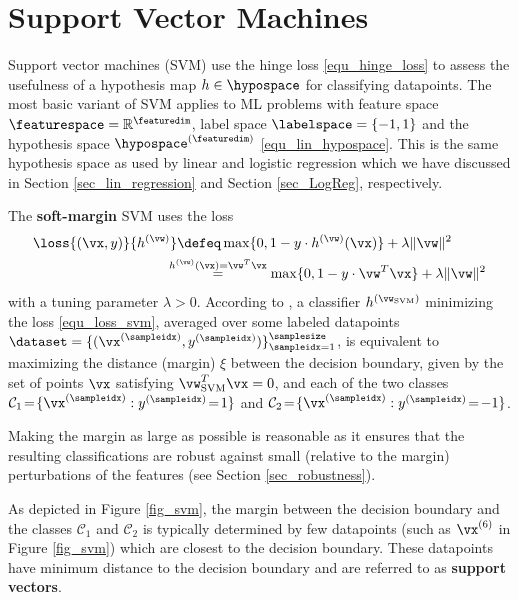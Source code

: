 \documentclass[12pt]{report}
\begin{document}
\section{Support Vector Machines} 
\label{sec_SVM} 
Support vector machines (SVM) use the hinge loss \eqref{equ_hinge_loss} to 
assess the usefulness of a hypothesis map $h \in \hypospace$ for classifying datapoints. 
The most basic variant of SVM applies to ML problems with feature space 
$\featurespace=\mathbb{R}^{\featuredim}$, label space $\labelspace = \{-1,1\}$ 
and the hypothesis space $\hypospace^{(\featuredim)}$ \eqref{equ_lin_hypospace}. 
This is the same hypothesis space as used by linear and logistic regression 
which we have discussed in Section \ref{sec_lin_regression} and Section \ref{sec_LogReg}, 
respectively. 

The {\bf soft-margin} SVM \cite[Chapter 2]{LampertNowKernel} uses the loss  
\begin{align}
\loss{(\vx,y)}{h^{(\vw)}} & \defeq  \max \{ 0 , 1 - y\cdot h^{(\vw)}(\vx) \}  + \lambda \| \vw \|^{2} \nonumber \\
   & \hspace*{-3mm}\stackrel{h^{(\vw)}(\vx) = \vw^{T} \vx}{=}  \max \{ 0 , 1 - y\cdot \vw^{T} \vx \} + \lambda \| \vw \|^{2} \label{equ_loss_svm}
\end{align}
with a tuning parameter $\lambda >0$. According to \cite[Chapter 2]{LampertNowKernel}, a classifier $h^{(\vw_{\rm SVM})}$ 
minimizing the loss \eqref{equ_loss_svm}, averaged over some labeled datapoints $\dataset = \{ ( \vx^{(\sampleidx)}, y^{(\sampleidx)}) \}_{\sampleidx=1}^{\samplesize}$, 
is equivalent to maximizing the distance (margin) $\xi$ between 
the decision boundary, given by the set of points $\vx$ satisfying 
$\vw_{\rm SVM}^{T} \vx=0$, and each of the two classes 
$\mathcal{C}_{1}\!=\!\{ \vx^{(\sampleidx)} : y^{(\sampleidx)}\!=\!1\}$ and 
$\mathcal{C}_{2}\!=\!\{ \vx^{(\sampleidx)} : y^{(\sampleidx)}\!=\!-1 \}$. 

Making the margin as large as possible is reasonable as it ensures 
that the resulting classifications are robust against small (relative 
to the margin) perturbations of the features (see Section \ref{sec_robustness}). 

As depicted in Figure \ref{fig_svm}, the margin between the decision 
boundary and the classes $\mathcal{C}_{1}$ and $\mathcal{C}_{2}$ 
is typically determined by few datapoints (such as $\vx^{(6)}$ in 
Figure \ref{fig_svm}) which are closest to the decision boundary. 
These datapoints have minimum distance to the decision boundary 
and are referred to as {\bf support vectors}. 
\end{document}
